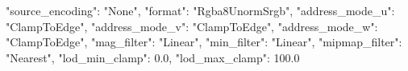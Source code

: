 {
    "source_encoding": "None",
    "format": "Rgba8UnormSrgb",
    "address_mode_u": "ClampToEdge",
    "address_mode_v": "ClampToEdge",
    "address_mode_w": "ClampToEdge",
    "mag_filter": "Linear",
    "min_filter": "Linear",
    "mipmap_filter": "Nearest",
    "lod_min_clamp": 0.0,
    "lod_max_clamp": 100.0
}